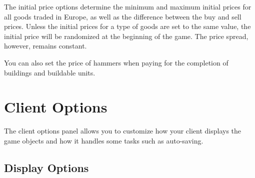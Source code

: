 \documentclass[12pt]{book}
\begin{document}
The initial price options determine the minimum and maximum initial
prices for all goods traded in Europe, as well as the difference
between the buy and sell prices. Unless the initial prices for a type
of goods are set to the same value, the initial price will be
randomized at the beginning of the game. The price spread, however,
remains constant.

You can also set the price of hammers when paying for the completion
of buildings and buildable units.


\hypertarget{client options}{\section{Client Options}}

The client options panel allows you to customize how your client
displays the game objects and how it handles some tasks such as
auto-saving.

\hypertarget{display options}{\subsection{Display Options}}
\end{document}
